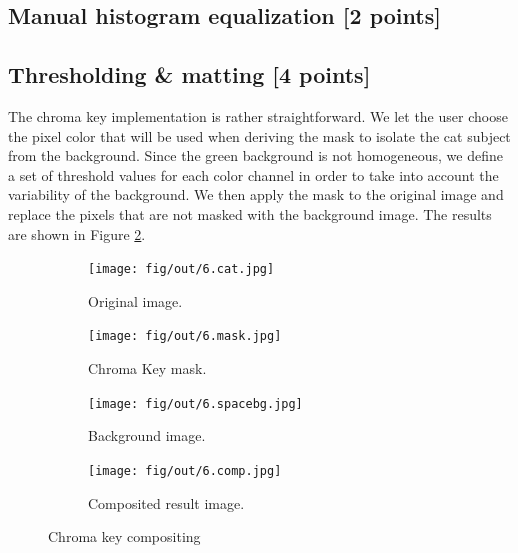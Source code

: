 \documentclass[tikz,14pt,fleqn]{article}
\begin{document}
\subsection{Manual histogram equalization [2 points]}

\subsection{Thresholding \& matting [4 points]}
The chroma key implementation is rather straightforward. We let the user choose the pixel color that will be used when deriving the mask to isolate the cat subject from the background. Since the green background is not homogeneous, we define a set of threshold values for each color channel in order to take into account the variability of the background. We then apply the mask to the original image and replace the pixels that are not masked with the background image. The results are shown in Figure \ref{fig:6.comp}. 
\begin{figure}[h!]
    \begin{center}
    \begin{subfigure}{0.22\textwidth}
        \centering
        \texttt{[image: fig/out/6.cat.jpg]}
        \caption{Original image.}
    \end{subfigure}
    \begin{subfigure}{0.22\textwidth}
        \centering
        \texttt{[image: fig/out/6.mask.jpg]}
        \caption{Chroma Key mask.}
    \end{subfigure}
    \begin{subfigure}{0.22\textwidth}
        \centering
        \texttt{[image: fig/out/6.spacebg.jpg]}
        \caption{Background image.}
    \end{subfigure}

    \begin{subfigure}{.67\textwidth}
        \centering
        \texttt{[image: fig/out/6.comp.jpg]}
        \caption{Composited result image.}
        \label{fig:6.comp}
    \end{subfigure}
\end{center}
    \caption{Chroma key compositing}
\end{figure}
\end{document}
